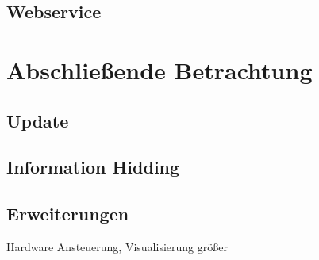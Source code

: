 	\subsection{Webservice}

\section{Abschließende Betrachtung}
	\subsection{Update }%
	\subsection{Information Hidding} %
	\subsection{Erweiterungen}
	Hardware Ansteuerung, Visualisierung größer

